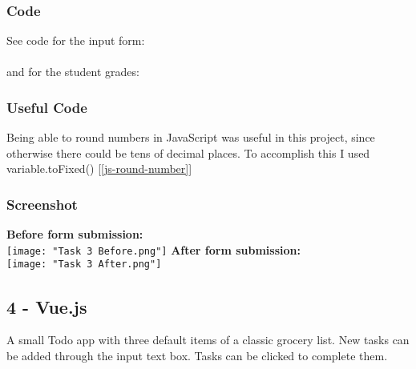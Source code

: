 \documentclass[portfolio.tex]{subfiles}
\begin{document}
				\subsubsection{Code}
					See code for the input form: \\

					\\

					and for the student grades: \\


				\subsubsection{Useful Code}
					Being able to round numbers in JavaScript was useful in this project, since otherwise there could be tens of decimal places. To accomplish this I used variable.toFixed() [\ref{js-round-number}]

				\subsubsection{Screenshot}
					\textbf{Before form submission:} \\
					\texttt{[image: "Task 3 Before.png"]}
					\textbf{After form submission:}\\
					\texttt{[image: "Task 3 After.png"]}\\

					\hspace{-0.8cm}


			\subsection{4 - Vue.js}
				A small Todo app with three default items of a classic grocery list. New tasks can be added through the input text box. Tasks can be clicked to complete them. \\
\end{document}
